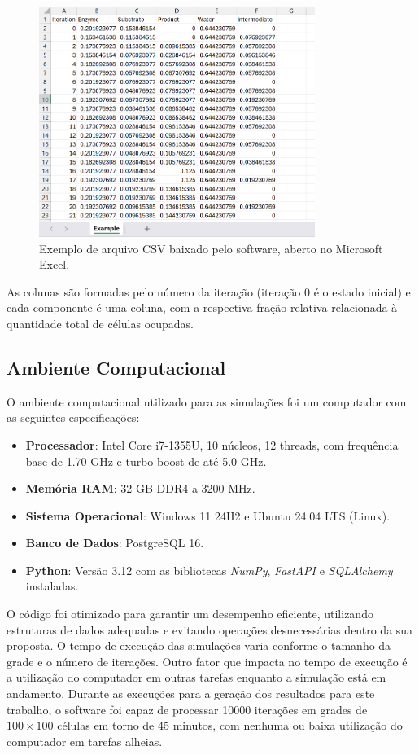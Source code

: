 \documentclass[12pt,oneside]{report}
\begin{document}
\begin{figure}[H]
    \centering
    \includegraphics[width=0.8\textwidth]{img/example_csv.png}
    \caption{\small Exemplo de arquivo CSV baixado pelo software, aberto no Microsoft Excel.}
    \label{fig:interface_simulacao_download}
\end{figure}

As colunas são formadas pelo número da iteração (iteração 0 é o estado inicial) e cada componente é uma coluna, com a respectiva fração relativa relacionada à quantidade total de células ocupadas.

\subsection{Ambiente Computacional}

O ambiente computacional utilizado para as simulações foi um computador com as seguintes especificações:
\begin{itemize}
    \item \textbf{Processador}: Intel Core i7-1355U, 10 núcleos, 12 threads, com frequência base de 1.70 GHz e turbo boost de até 5.0 GHz.
    \item \textbf{Memória RAM}: 32 GB DDR4 a 3200 MHz.
    \item \textbf{Sistema Operacional}: Windows 11 24H2 e Ubuntu 24.04 LTS (Linux).
    \item \textbf{Banco de Dados}: PostgreSQL 16.
    \item \textbf{Python}: Versão 3.12 com as bibliotecas \textit{NumPy}, \textit{FastAPI} e \textit{SQLAlchemy} instaladas.
\end{itemize}

O código foi otimizado para garantir um desempenho eficiente, utilizando estruturas de dados adequadas e evitando operações desnecessárias dentro da sua proposta. O tempo de execução das simulações varia conforme o tamanho da grade e o número de iterações. Outro fator que impacta no tempo de execução é a utilização do computador em outras tarefas enquanto a simulação está em andamento. Durante as execuções para a geração dos resultados para este trabalho, o software foi capaz de processar 10000 iterações em grades de $100 \times 100$ células em torno de 45 minutos, com nenhuma ou baixa utilização do computador em tarefas alheias.
\end{document}
